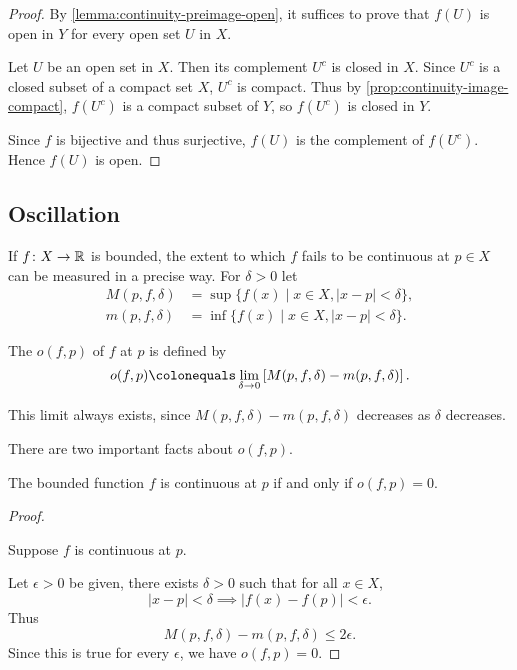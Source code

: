 \begin{proof}
By \ref{lemma:continuity-preimage-open}, it suffices to prove that $f(U)$ is open in $Y$ for every open set $U$ in $X$. 

Let $U$ be an open set in $X$. Then its complement $U^c$ is closed in $X$. Since $U^c$ is a closed subset of a compact set $X$, $U^c$ is compact. Thus by \ref{prop:continuity-image-compact}, $f(U^c)$ is a compact subset of $Y$, so $f(U^c)$ is closed in $Y$.

Since $f$ is bijective and thus surjective, $f(U)$ is the complement of $f(U^c)$. Hence $f(U)$ is open.
\end{proof}
\pagebreak

\subsection{Oscillation}
If $f\colon X\to\mathbb R$ is bounded, the extent to which $f$ fails to be continuous at $p\in X$ can be measured in a precise way. For $\delta>0$ let
\begin{align*}
M(p,f,\delta)&=\sup\{f(x)\mid x\in X, |x-p|<\delta\},\\
m(p,f,\delta)&=\inf\{f(x)\mid x\in X, |x-p|<\delta\}.
\end{align*}

\begin{definition}[Oscillation]
The  $o(f,p)$ of $f$ at $p$ is defined by
\[o(f,p)\colonequals\lim_{\delta\to0}\sqbrac{M(p,f,\delta)-m(p,f,\delta)}.\]
\end{definition}

This limit always exists, since $M(p,f,\delta)-m(p,f,\delta)$ decreases as $\delta$ decreases. 

There are two important facts about $o(f,p)$.

\begin{lemma}
The bounded function $f$ is continuous at $p$ if and only if $o(f,p)=0$. 
\end{lemma}

\begin{proof} \

\fbox{$\implies$} Suppose $f$ is continuous at $p$. 

Let $\epsilon>0$ be given, there exists $\delta>0$ such that for all $x\in X$,
\[|x-p|<\delta\implies|f(x)-f(p)|<\epsilon.\]
Thus
\[M(p,f,\delta)-m(p,f,\delta)\le2\epsilon.\]
Since this is true for every $\epsilon$, we have $o(f,p)=0$.

\fbox{$\impliedby$} 
\end{proof}

